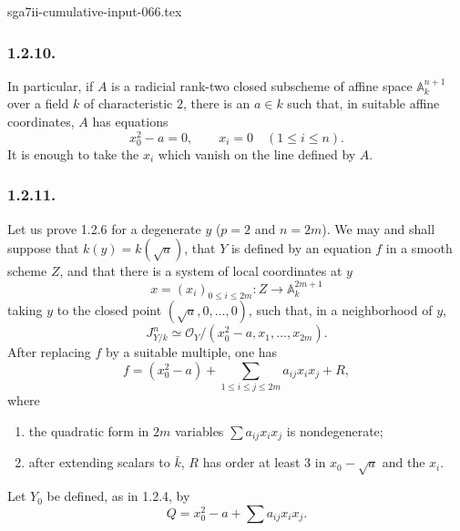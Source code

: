\begin{filecontents*}{sga7ii-cumulative-input-066.tex}
\subsubsection*{1.2.10.}
In particular, if $A$ is a radicial rank-two closed subscheme of
affine space $\mathbb A_k^{n+1}$ over a field $k$ of characteristic
$2$, there is an $a\in k$ such that, in suitable affine coordinates,
$A$ has equations
\[
x_0^2-a=0,
\qquad x_i=0\quad(1\leq i\leq n).
\]
It is enough to take the $x_i$ which vanish on the line defined by
$A$.

\subsubsection*{1.2.11.}
Let us prove 1.2.6 for a degenerate $y$ ($p=2$ and $n=2m$).  We may
and shall suppose that $k(y)=k(\sqrt a)$, that $Y$ is defined by an
equation $f$ in a smooth scheme $Z$, and that there is a system of
local coordinates at $y$
\[
x=(x_i)_{0\leq i\leq2m}:
Z\longrightarrow\mathbb A_k^{2m+1}
\]
taking $y$ to the closed point $(\sqrt a,0,\ldots,0)$, such that, in
a neighborhood of $y$,
\[
J^n_{Y/k}\simeq
\mathcal O_Y/(x_0^2-a,x_1,\ldots,x_{2m}).
\]
After replacing $f$ by a suitable multiple, one has
\[
f=(x_0^2-a)+
 \sum_{1\leq i\leq j\leq2m}a_{ij}x_ix_j+R,
\]
where
\begin{enumerate}[label=(\alph*),leftmargin=2.6em]
\item the quadratic form in $2m$ variables
$\sum a_{ij}x_ix_j$ is nondegenerate;
\item after extending scalars to $\bar k$, $R$ has order at least
$3$ in $x_0-\sqrt a$ and the $x_i$.
\end{enumerate}
Let $Y_0$ be defined, as in 1.2.4, by
\[
Q=x_0^2-a+\sum a_{ij}x_ix_j.
\]


\end{filecontents*}
